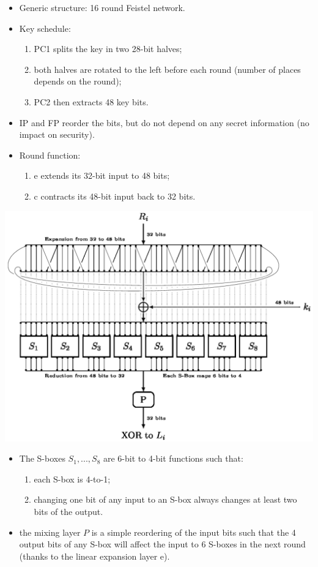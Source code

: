 		\begin{itemize}
			\item Generic structure: 16 round Feistel network.
			\item Key schedule:
			\begin{enumerate}
				\item PC1 splits the key in two 28-bit halves;
				\item both halves are rotated to the left before each round (number of places depends on the round);
				\item PC2 then extracts 48 key bits.
			\end{enumerate}
			\item IP and FP reorder the bits, but do not depend on any secret information (no impact on security).
			\item Round function:
			\begin{enumerate}
				\item e extends its 32-bit input to 48 bits;
				\item c contracts its 48-bit input back to 32 bits.
			\end{enumerate}
		\end{itemize}
	    \begin{center}
			\includegraphics[width=160mm]{Graphics/Block Ciphers/bc4.png}
		\end{center}
		\begin{itemize}
			\item The S-boxes $S_1,...,S_8$ are 6-bit to 4-bit functions such that:
			\begin{enumerate}
				\item each S-box is 4-to-1;
				\item changing one bit of any input to an S-box always changes at least two bits of the output.
			\end{enumerate}
			\item the mixing layer $P$ is a simple reordering of the input bits such that the 4 output bits of any S-box 
			will affect the input to 6 S-boxes in the next round (thanks to the linear expansion layer e).\\
		\end{itemize}
